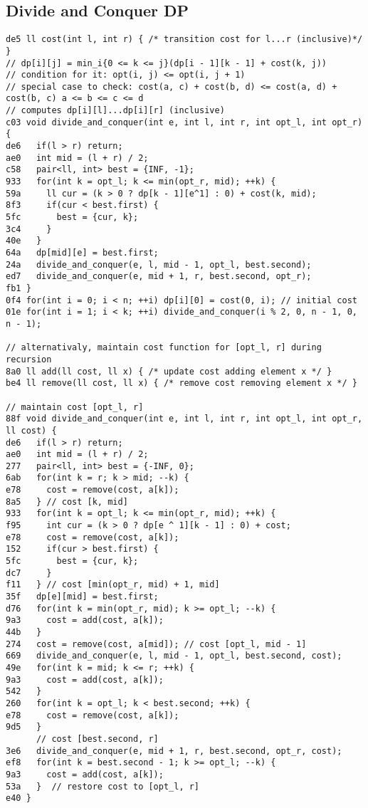 \documentclass[10pt, a4paper, twoside]{article}
\begin{document}
\subsection{Divide and Conquer DP}
\begin{lstlisting}
de5 ll cost(int l, int r) { /* transition cost for l...r (inclusive)*/ }
// dp[i][j] = min_i{0 <= k <= j}(dp[i - 1][k - 1] + cost(k, j))
// condition for it: opt(i, j) <= opt(i, j + 1)
// special case to check: cost(a, c) + cost(b, d) <= cost(a, d) + cost(b, c) a <= b <= c <= d 
// computes dp[i][l]...dp[i][r] (inclusive)
c03 void divide_and_conquer(int e, int l, int r, int opt_l, int opt_r) {
de6   if(l > r) return;
ae0   int mid = (l + r) / 2;
c58   pair<ll, int> best = {INF, -1};
933   for(int k = opt_l; k <= min(opt_r, mid); ++k) {
59a     ll cur = (k > 0 ? dp[k - 1][e^1] : 0) + cost(k, mid);
8f3     if(cur < best.first) {
5fc       best = {cur, k};
3c4     }
40e   }
64a   dp[mid][e] = best.first;
24a   divide_and_conquer(e, l, mid - 1, opt_l, best.second);
ed7   divide_and_conquer(e, mid + 1, r, best.second, opt_r);
fb1 }
0f4 for(int i = 0; i < n; ++i) dp[i][0] = cost(0, i); // initial cost
01e for(int i = 1; i < k; ++i) divide_and_conquer(i % 2, 0, n - 1, 0, n - 1);

// alternativaly, maintain cost function for [opt_l, r] during recursion
8a0 ll add(ll cost, ll x) { /* update cost adding element x */ }
be4 ll remove(ll cost, ll x) { /* remove cost removing element x */ }

// maintain cost [opt_l, r]
88f void divide_and_conquer(int e, int l, int r, int opt_l, int opt_r, ll cost) {
de6   if(l > r) return;
ae0   int mid = (l + r) / 2;
277   pair<ll, int> best = {-INF, 0};
6ab   for(int k = r; k > mid; --k) {
e78     cost = remove(cost, a[k]);
8a5   } // cost [k, mid]
933   for(int k = opt_l; k <= min(opt_r, mid); ++k) {
f95     int cur = (k > 0 ? dp[e ^ 1][k - 1] : 0) + cost;
e78     cost = remove(cost, a[k]);
152     if(cur > best.first) {
5fc       best = {cur, k};
dc7     }
f11   } // cost [min(opt_r, mid) + 1, mid]
35f   dp[e][mid] = best.first;
d76   for(int k = min(opt_r, mid); k >= opt_l; --k) {
9a3     cost = add(cost, a[k]);
44b   }
274   cost = remove(cost, a[mid]); // cost [opt_l, mid - 1]
669   divide_and_conquer(e, l, mid - 1, opt_l, best.second, cost);
49e   for(int k = mid; k <= r; ++k) {
9a3     cost = add(cost, a[k]);
542   }
260   for(int k = opt_l; k < best.second; ++k) {
e78     cost = remove(cost, a[k]);
9d5   }
      // cost [best.second, r]
3e6   divide_and_conquer(e, mid + 1, r, best.second, opt_r, cost);
ef8   for(int k = best.second - 1; k >= opt_l; --k) {
9a3     cost = add(cost, a[k]);
53a   }  // restore cost to [opt_l, r]
e40 }
\end{lstlisting}
\end{document}
